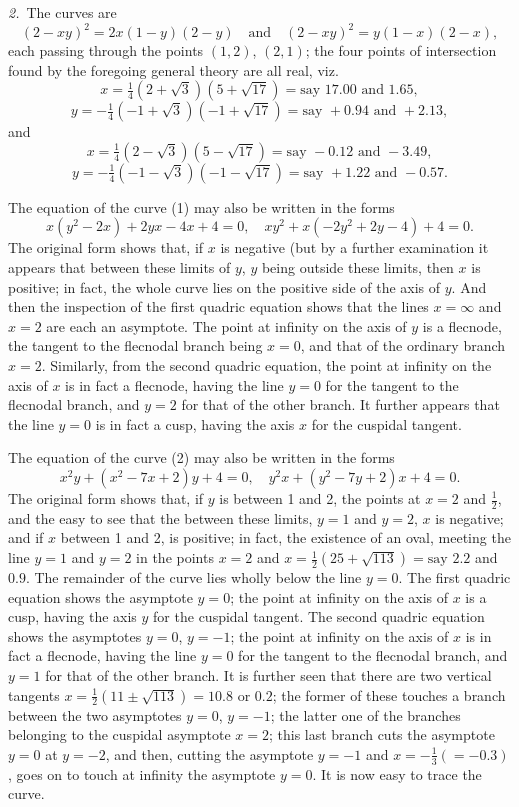 \documentclass[11pt,a4paper]{book}
\begin{document}
\begin{solution}
\medskip

\textit{2.}~The curves are
\[
(2-xy)^2 = 2x(1-y)(2-y) \quad\text{and}\quad (2-xy)^2 = y(1-x)(2-x),
\]
each passing through the points $(1,2)$, $(2,1)$; the four points of intersection found by the foregoing general theory are all real, viz.
\[
x = \tfrac{1}{4}(2+\sqrt{3})(5+\sqrt{17}) = \text{say } 17.00 \text{ and } 1.65,
\]
\[
y = -\tfrac{1}{4}(-1+\sqrt{3})(-1+\sqrt{17}) = \text{say } +0.94 \text{ and } +2.13,
\]
and
\[
x = \tfrac{1}{4}(2-\sqrt{3})(5-\sqrt{17}) = \text{say } -0.12 \text{ and } -3.49,
\]
\[
y = -\tfrac{1}{4}(-1-\sqrt{3})(-1-\sqrt{17}) = \text{say } +1.22 \text{ and } -0.57.
\]

The equation of the curve (1) may also be written in the forms
\[
x(y^2-2x) + 2yx - 4x + 4 = 0, \quad xy^2 + x(-2y^2+2y-4) + 4 = 0.
\]
The original form shows that, if $x$ is negative (but by a further examination it appears that between these limits of $y$, $y$ being outside these limits, then $x$ is positive; in fact, the whole curve lies on the positive side of the axis of $y$. And then the inspection of the first quadric equation shows that the lines $x=\infty$ and $x=2$ are each an asymptote. The point at infinity on the axis of $y$ is a flecnode, the tangent to the flecnodal branch being $x=0$, and that of the ordinary branch $x=2$. Similarly, from the second quadric equation, the point at infinity on the axis of $x$ is in fact a flecnode, having the line $y=0$ for the tangent to the flecnodal branch, and $y=2$ for that of the other branch. It further appears that the line $y=0$ is in fact a cusp, having the axis $x$ for the cuspidal tangent.

The equation of the curve (2) may also be written in the forms
\[
x^2y + (x^2-7x+2)y + 4 = 0, \quad y^2x + (y^2-7y+2)x + 4 = 0.
\]
The original form shows that, if $y$ is between 1 and 2, the points at $x=2$ and $\frac{1}{2}$, and the easy to see that the between these limits, $y=1$ and $y=2$, $x$ is negative; and if $x$ between 1 and 2, is positive; in fact, the existence of an oval, meeting the line $y=1$ and $y=2$ in the points $x=2$ and $x=\frac{1}{2}(25+\sqrt{113}) = \text{say } 2.2$ and $0.9$. The remainder of the curve lies wholly below the line $y=0$. The first quadric equation shows the asymptote $y=0$; the point at infinity on the axis of $x$ is a cusp, having the axis $y$ for the cuspidal tangent. The second quadric equation shows the asymptotes $y=0$, $y=-1$; the point at infinity on the axis of $x$ is in fact a flecnode, having the line $y=0$ for the tangent to the flecnodal branch, and $y=1$ for that of the other branch. It is further seen that there are two vertical tangents $x = \frac{1}{2}(11 \pm \sqrt{113}) = 10.8$ or $0.2$; the former of these touches a branch between the two asymptotes $y=0$, $y=-1$; the latter one of the branches belonging to the cuspidal asymptote $x=2$; this last branch cuts the asymptote $y=0$ at $y=-2$, and then, cutting the asymptote $y=-1$ and $x=-\frac{1}{3} (= -0.3)$, goes on to touch at infinity the asymptote $y=0$. It is now easy to trace the curve.


\end{solution}
\end{document}
